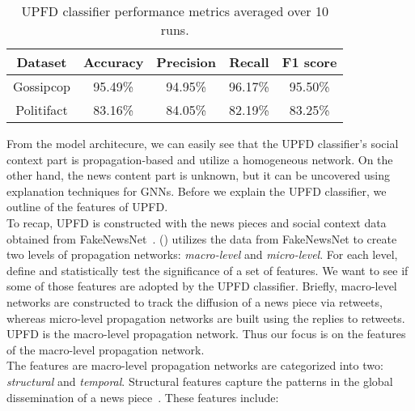 \begin{table}
    \centering
    \begin{tabular}{c | c | c | c | c}
        \textbf{Dataset} & \textbf{Accuracy} & \textbf{Precision} & \textbf{Recall} & \textbf{F1 score} \\
        \hline
        Gossipcop        & 95.49\%           & 94.95\%            & 96.17\%         & 95.50\%           \\
        \hline
        Politifact       & 83.16\%           & 84.05\%            & 82.19\%         & 83.25\%           \\
    \end{tabular}
    \caption[UPFD classifier performance metrics averaged over 10 runs.]{UPFD classifier performance metrics averaged over 10 runs.}
    \label{tab:UPFDClassifier_Results}
\end{table}
From the model architecure, we can easily see that the UPFD classifier's social context part is propagation-based and utilize a homogeneous network. On the other hand, the news content part is unknown, but it can be uncovered using explanation techniques for GNNs. Before we explain the UPFD classifier, we outline of the features of UPFD.\\
To recap, UPFD is constructed with the news pieces and social context data obtained from FakeNewsNet~\parencite{FakeNewsNet_Shu}. \citeauthor{HierarchicalPropagationNetworksForFND_Shu} (\citeyear{HierarchicalPropagationNetworksForFND_Shu}) utilizes the data from FakeNewsNet to create two levels of propagation networks: \emph{macro-level} and \emph{micro-level}. For each level, ~\citeauthor{HierarchicalPropagationNetworksForFND_Shu} define and statistically test the significance of a set of features. We want to see if some of those features are adopted by the UPFD classifier. Briefly, macro-level networks are constructed to track the diffusion of a news piece via retweets, whereas micro-level propagation networks are built using the replies to retweets. UPFD is the macro-level propagation network. Thus our focus is on the features of the macro-level propagation network.\\
The features are macro-level propagation networks are categorized into two: \emph{structural} and \emph{temporal}. Structural features capture the patterns in the global dissemination of a news piece~\parencite{HierarchicalPropagationNetworksForFND_Shu}. These features include:
